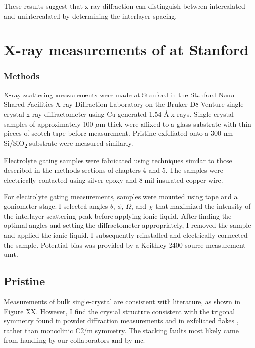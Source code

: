 These results suggest that x-ray diffraction can distinguish between intercalated and unintercalated \rucl by determining the interlayer spacing.

\section{X-ray measurements of \rucl at Stanford} 

\subsubsection{Methods}
X-ray scattering measurements were made at Stanford in the Stanford Nano Shared Facilities X-ray Diffraction Laboratory on the Bruker D8 Venture single crystal x-ray diffractometer using Cu-generated 1.54 \AA{} x-rays. Single crystal samples of \rucl approximately 100 $\mu$m thick were affixed to a glass substrate with thin pieces of scotch tape before measurement. Pristine \rucl exfoliated onto a 300 nm Si/SiO\textsubscript{2} substrate were measured similarly.

Electrolyte gating samples were fabricated using techniques similar to those described in the methods sections of chapters 4 and 5. The samples were electrically contacted using silver epoxy and 8 mil insulated copper wire.

For electrolyte gating measurements, samples were mounted using tape and a goniometer stage. I selected angles $\theta$, $\phi$, $\Omega$, and $\chi$ that maximized the intensity of the interlayer scattering peak before applying ionic liquid. After finding the optimal angles and setting the diffractometer appropriately, I removed the sample and applied the ionic liquid. I subsequently reinstalled and electrically connected the sample. Potential bias was provided by a Keithley 2400 source measurement unit.

\subsection{Pristine \rucl}

Measurements of bulk single-crystal \rucl are consistent with literature, as shown in Figure XX. However, I find the crystal structure consistent with the trigonal symmetry found in powder diffraction measurements  \cite{Fletcher1967} and in exfoliated flakes \cite{Gronke2018}, rather than monoclinic C2/m symmetry. The stacking faults most likely came from handling by our collaborators and by me.

